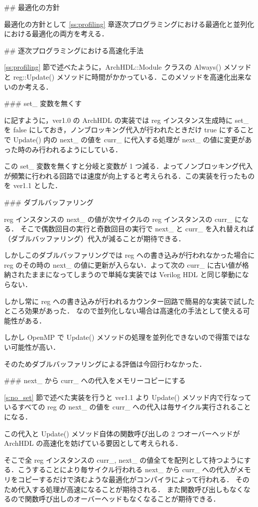 ## 最適化の方針

最適化の方針として \ref{ss:profiling} 章逐次プログラミングにおける最適化と並列化における最適化の両方を考える．


## 逐次プログラミングにおける高速化手法

\ref{ss:profiling} 節で述べたように，ArchHDL::Module クラスの Always() メソッドと
reg::Update() メソッドに時間がかかっている．このメソッドを高速化出来ないのか考える．


### set_ 変数を無くす \label{s:no_set}

 に記すように，ver1.0 の ArchHDL の実装では reg インスタンス生成時に set_ を false
にしておき，ノンブロッキング代入が行われたときだけ true にすることで
Update() 内の next_ の値を curr_
に代入する処理が next_ の値に変更があった時のみ行われるようにしている．

この set_ 変数を無くすと分岐と変数が 1 つ減る．よってノンブロッキング代入が頻繁に行われる回路では速度が向上すると考えられる．この実装を行ったものを ver1.1 とした．



### ダブルバッファリング

reg インスタンスの next_ の値が次サイクルの reg インスタンスの curr_ になる．
そこで偶数回目の実行と奇数回目の実行で next_ と curr_
を入れ替えれば（ダブルバッファリング）代入が減ることが期待できる．

しかしこのダブルバッファリングでは reg への書き込みが行われなかった場合に
reg のその時の next_ の値に更新が入らない．よって次の
curr_ に古い値が格納されたままになってしまうので単純な実装では Verilog HDL と同じ挙動にならない．

しかし常に reg への書き込みが行われるカウンター回路で簡易的な実装で試したところ効果があった．
なので並列化しない場合は高速化の手法として使える可能性がある．

しかし OpenMP で Update() メソッドの処理を並列化できないので得策ではない可能性が高い．

そのためダブルバッファリングによる評価は今回行わなかった．


### next_ から curr_ への代入をメモリーコピーにする

\ref{s:no_set} 節で述べた実装を行うと ver1.1 より
Update() メソッド内で行なっているすべての reg の next_
の値を curr_ への代入は毎サイクル実行されることになる．

この代入と Update() メソッド自体の関数呼び出しの
2 つオーバーヘッドが ArchHDL の高速化を妨げている要因として考えられる．

そこで全 reg インスタンスの curr_, next_
の値全てを配列として持つようにする．こうすることにより毎サイクル行われる next_ から curr_
への代入がメモリをコピーするだけで済むような最適化がコンパイラによって行われる．
そのため代入する処理が高速になることが期待される．
また関数呼び出しもなくなるので関数呼び出しのオーバーヘッドもなくなることが期待できる．

